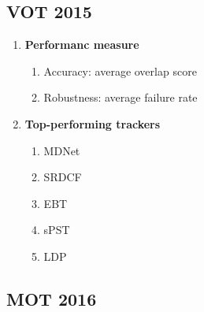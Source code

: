 \subsection{VOT 2015} \cite{kristan2015visual}

    \begin{enumerate}
        \item \textbf{Performanc measure}
            \begin{enumerate}
                \item Accuracy: average overlap score
                \item Robustness: average failure rate
            \end{enumerate}
        \item \textbf{Top-performing trackers}
            \begin{enumerate}
                \item MDNet \cite{nam2015learning}
                \item SRDCF \cite{danelljan2015learning}
                \item EBT \cite{zhu2015tracking}
                \item sPST \cite{hua2015online}
                \item LDP \cite{lukevzivc2016deformable}
            \end{enumerate}
    \end{enumerate}

\subsection{MOT 2016} \cite{milan2016mot16}


